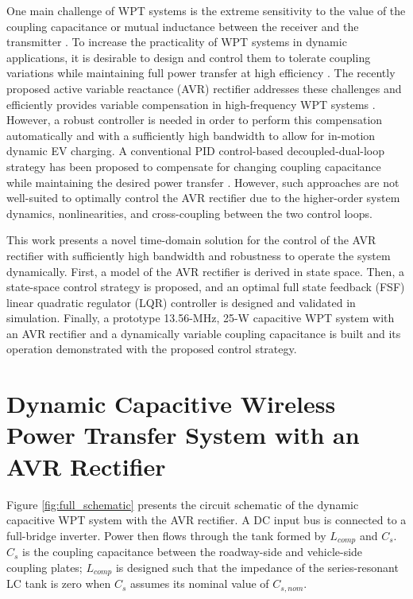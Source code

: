 \documentclass[conference, twocolumn, letterpaper]{IEEEtran}
\begin{document}
One main challenge of WPT systems is the extreme sensitivity to the value of the coupling capacitance or mutual inductance between the receiver and the transmitter \cite{2011_Budhia_Journal}. To increase the practicality of WPT systems in dynamic applications, it is desirable to design and control them to tolerate coupling variations while maintaining full power transfer at high efficiency \cite{2014_Lim_Journal, 2013_Beh_Journal, 2019_Choi_Journal, 2017_Kamineni_Journal}. The recently proposed active variable reactance (AVR) rectifier addresses these challenges and efficiently provides variable compensation in high-frequency WPT systems \cite{2019_Sinha_Journal}. However, a robust controller is needed in order to perform this compensation automatically and with a sufficiently high bandwidth to allow for in-motion dynamic EV charging. A conventional PID control-based decoupled-dual-loop strategy has been proposed to compensate for changing coupling capacitance while maintaining the desired power transfer \cite{2019_Sinha_ECCE, 2024_Maji_COMPEL}. However, such approaches are not well-suited to optimally control the AVR rectifier due to the higher-order system dynamics, nonlinearities, and cross-coupling between the two control loops.

This work presents a novel time-domain solution for the control of the AVR rectifier with sufficiently high bandwidth and robustness to operate the system dynamically. First, a model of the AVR rectifier is derived in state space. Then, a state-space control strategy is proposed, and an optimal full state feedback (FSF) linear quadratic regulator (LQR) controller is designed and validated in simulation. Finally, a prototype 13.56-MHz, 25-W capacitive WPT system with an AVR rectifier and a dynamically variable coupling capacitance is built and its operation demonstrated with the proposed control strategy.

\vspace{0.5cm}

\section{Dynamic Capacitive Wireless Power Transfer System with an AVR Rectifier}
\label{sec:system}

Figure \ref{fig:full_schematic} presents the circuit schematic of the dynamic capacitive WPT system with the AVR rectifier. A DC input bus is connected to a full-bridge inverter. Power then flows through the tank formed by $L_{comp}$ and $C_s$. $C_s$ is the coupling capacitance between the roadway-side and vehicle-side coupling plates; $L_{comp}$ is designed such that the impedance of the series-resonant LC tank is zero when $C_s$ assumes its nominal value of $C_{s,nom}$.
\end{document}
